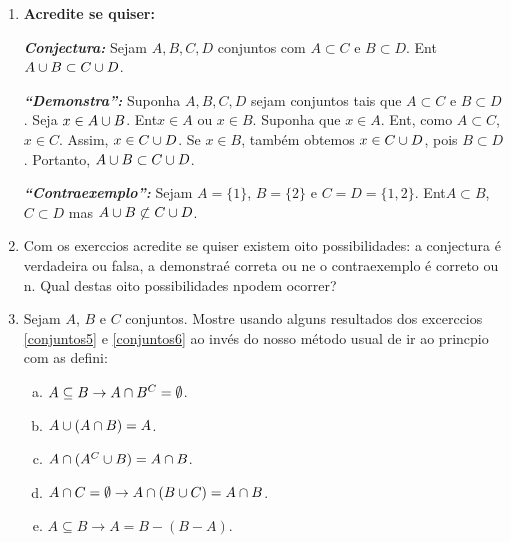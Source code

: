 \begin{enumerate}[{\bf 1.}]
\noindent \textit{\textbf{Conjectura:}} Seja $A$ e $B$ conjuntos tais que $A\subseteq B$. Ent\ao $A-B=\emptyset$.

\noindent \textit{\textbf{``Demonstra\caoi'':}} Suponha que $A$ e $B$ sejam conjuntos com $A\subseteq B$. Seja $x\in A-B$. Ent\ao $x\in B$ e $x\notin A$. Mas $A\subseteq B$ assim $x\notin A$ implica $x\notin B$, uma contradi\caoi. Logo, $A-B=\emptyset$.

\noindent \textit{\textbf{``Contraexemplo'':}} Seja $A=\{1,2,3\}$, $B=\{2,3\}$. Ent\ao $A\subseteq B$ mas $A-B\neq\emptyset$.

\item {\bf Acredite se quiser:}  

\noindent \textit{\textbf{Conjectura:}} Sejam $A,B,C,D$ conjuntos com $A\subset C$ e $B\subset D$. Ent\ao $A\cup B \subset C\cup D$. 

\noindent \textit{\textbf{``Demonstra\caoi'':}} Suponha $A,B,C,D$ sejam conjuntos tais que $A\subset C$ e $B\subset D$. Seja $x\in A\cup B$. Ent\ao $x\in A$ ou $x\in B$. Suponha que $x\in A$. Ent\aoi, como $A\subset C$, $x\in C$. Assim, $x\in C\cup D$. Se $x\in B$, tamb\'em obtemos $x\in C\cup D$, pois $B\subset D$. Portanto, $A\cup B\subset C\cup D$.

\noindent \textit{\textbf{``Contraexemplo'':}} Sejam $A=\{1\}$, $B=\{2\}$ e $C=D=\{1,2\}$. Ent\ao $A\subset B$, $C\subset D$ mas $A\cup B \not\subset C\cup D$.

\item Com os exerc\ih cios acredite se quiser existem oito possibilidades: a conjectura \'e verdadeira ou falsa, a demonstra\cao \'e correta ou n\ao e o contraexemplo \'e correto ou n\aoi. Qual destas oito possibilidades n\ao podem ocorrer?

\item Sejam $A$, $B$ e $C$ conjuntos. Mostre usando alguns resultados dos excerc\ih cios \ref{conjuntos5} e \ref{conjuntos6} ao inv\'es do nosso m\'etodo usual de ir ao princ\ih pio com as defini\cois:
\begin{enumerate}[a)]
\item $A\subseteq B \to A\cap B^C=\emptyset$.
\item $A\cup(A\cap B)=A$.
\item $A\cap(A^C\cup B)=A\cap B$.
\item $A\cap C=\emptyset \to A\cap(B\cup C)=A\cap B$.
\item $A\subseteq B \to A=B-(B-A)$.
\end{enumerate}


\end{enumerate}
